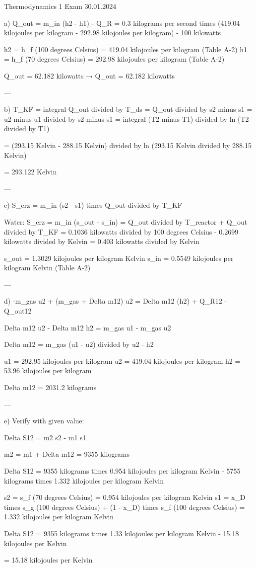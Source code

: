 Thermodynamics 1 Exam  
30.01.2024  

a)  
Q_out = m_in (h2 - h1) - Q_R = 0.3 kilograms per second times (419.04 kilojoules per kilogram - 292.98 kilojoules per kilogram) - 100 kilowatts  

h2 = h_f (100 degrees Celsius) = 419.04 kilojoules per kilogram (Table A-2)  
h1 = h_f (70 degrees Celsius) = 292.98 kilojoules per kilogram (Table A-2)  

Q_out = 62.182 kilowatts → Q_out = 62.182 kilowatts  

---

b)  
T_KF = integral Q_out divided by T_ds = Q_out divided by s2 minus s1 = u2 minus u1 divided by s2 minus s1 = integral (T2 minus T1) divided by ln (T2 divided by T1)  

= (293.15 Kelvin - 288.15 Kelvin) divided by ln (293.15 Kelvin divided by 288.15 Kelvin)  

= 293.122 Kelvin  

---

c)  
S_erz = m_in (s2 - s1) times Q_out divided by T_KF  

Water:  
S_erz = m_in (s_out - s_in) = Q_out divided by T_reactor + Q_out divided by T_KF = 0.1036 kilowatts divided by 100 degrees Celsius - 0.2699 kilowatts divided by Kelvin = 0.403 kilowatts divided by Kelvin  

s_out = 1.3029 kilojoules per kilogram Kelvin  
s_in = 0.5549 kilojoules per kilogram Kelvin (Table A-2)  

---

d)  
-m_gas u2 + (m_gas + Delta m12) u2 = Delta m12 (h2) + Q_R12 - Q_out12  

Delta m12 u2 - Delta m12 h2 = m_gas u1 - m_gas u2  

Delta m12 = m_gas (u1 - u2) divided by u2 - h2  

u1 = 292.95 kilojoules per kilogram  
u2 = 419.04 kilojoules per kilogram  
h2 = 53.96 kilojoules per kilogram  

Delta m12 = 2031.2 kilograms  

---

e)  
Verify with given value:  

Delta S12 = m2 s2 - m1 s1  

m2 = m1 + Delta m12 = 9355 kilograms  

Delta S12 = 9355 kilograms times 0.954 kilojoules per kilogram Kelvin - 5755 kilograms times 1.332 kilojoules per kilogram Kelvin  

s2 = s_f (70 degrees Celsius) = 0.954 kilojoules per kilogram Kelvin  
s1 = x_D times s_g (100 degrees Celsius) + (1 - x_D) times s_f (100 degrees Celsius) = 1.332 kilojoules per kilogram Kelvin  

Delta S12 = 9355 kilograms times 1.33 kilojoules per kilogram Kelvin - 15.18 kilojoules per Kelvin  

= 15.18 kilojoules per Kelvin